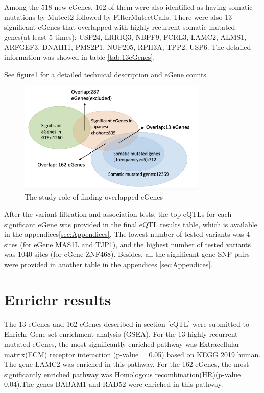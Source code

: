 Among the 518 new eGenes, 162 of them were also identified as having somatic mutations by Mutect2 followed by FilterMutectCalls. There were also 13 significant eGenes that overlapped with highly recurrent somatic mutated genes(at least 5 times): USP24, LRRIQ3, NBPF9, FCRL3, LAMC2, ALMS1, ARFGEF3, DNAH11, PMS2P1, NUP205, RPH3A, TPP2, USP6. The detailed information was showed in table \ref{tab:13eGenes}.


See figure\ref{Overlap} for a detailed technical description and eGene counts.

\begin{figure}[h]
\centering
\includegraphics[width=0.8\textwidth]{figures/Overlap.png}
\caption{The study role of finding overlapped eGenes}
\label{Overlap}
\end{figure}

After the variant filtration and association tests, the top eQTLs for each significant eGene was provided in the final eQTL results table, which is available in the appendices\ref{sec:Appendices}. The lowest number of tested variants was 4 sites (for eGene MAS1L and TJP1), and the highest number of tested variants was 1040 sites (for eGene ZNF468). Besides, all the significant gene-SNP pairs were provided in another table in the appendices \ref{sec:Appendices}.



\section{Enrichr results}
The 13 eGenes and 162 eGenes described in section \ref{eQTL} were submitted to Enrichr Gene set enrichment analysis (GSEA). For the 13 highly recurrent mutated eGenes, the most significantly enriched pathway was Extracellular matrix(ECM) receptor interaction (p-value = 0.05) based on KEGG 2019 human. The gene LAMC2 was enriched in this pathway. For the 162 eGenes, the most significantly enriched pathway was Homologous recombination(HR)(p-value = 0.04).The genes BABAM1 and RAD52 were enriched in this pathway.

